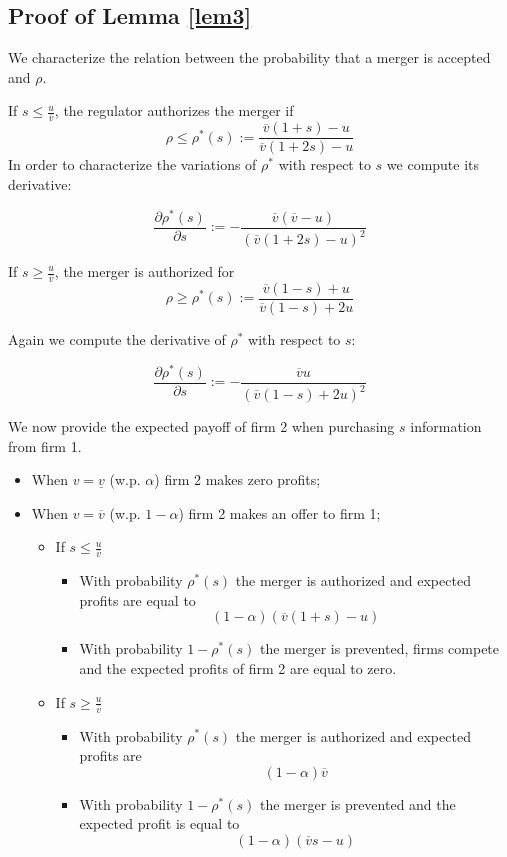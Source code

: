 \documentclass[a4paper,leqno]{article}%
\renewcommand{\a}{\alpha}
\newcommand{\uv}{\underline{v}}
\newcommand{\ov}{\overline{v}}
\begin{document}
\subsection{Proof of Lemma \ref{lem3}}\label{lem3p}

We characterize the relation between the probability that a merger is accepted and $\rho$.

If $s\leq \frac{u}{\ov}$, the regulator authorizes the merger if
    \begin{equation}
           \rho\leq \rho^*(s):=\frac{\ov(1+s)-u}{\ov(1+2s)-u}
    \end{equation}
In order to characterize the variations of $\rho^*$ with respect to $s$ we compute its derivative:

\[
\frac{\partial \rho^{*}(s)}{\partial s}:=-\frac{\ov(\ov-u)}{(\ov(1+2s)-u)^2}
\]
    
If $s\geq \frac{u}{\ov}$, the merger is authorized for 
    \begin{equation}
           \rho\geq \rho^*(s):=\frac{\ov(1-s)+u}{\ov(1-s)+2u}
    \end{equation}

Again we compute the derivative of $\rho^*$ with respect to $s$:

\[
    \frac{\partial \rho^{*}(s)}{\partial s}:=-\frac{\ov u}{(\ov(1-s)+2u)^2}
\]



We now provide the expected payoff of firm 2 when purchasing $s$ information from firm 1.


\begin{itemize}
    \item When $v=\uv$ (w.p. $\a$) firm 2 makes zero profits;
    \item When $v=\ov$ (w.p. $1-\a$) firm 2 makes an offer to firm 1;
    \begin{itemize}
    \item If $s\leq\frac{u}{\ov}$
    \begin{itemize}
        \item With probability $\rho^*(s)$ the merger is authorized and expected profits are equal to $$(1-\a)(\ov(1+s)-u)$$
        \item With probability $1-\rho^*(s)$ the merger is prevented, firms compete and the expected profits of firm 2 are equal to zero.
    \end{itemize}
    \item If $s\geq\frac{u}{\ov}$
    \begin{itemize}
        \item With probability $\rho^*(s)$ the merger is authorized and expected profits are
        $$(1-\a)\ov$$
        \item With probability $1-\rho^*(s)$ the merger is prevented and the expected profit is equal to $$(1-\a)(\ov s-u)$$
    \end{itemize} 
    \end{itemize}
\end{itemize}
\end{document}

